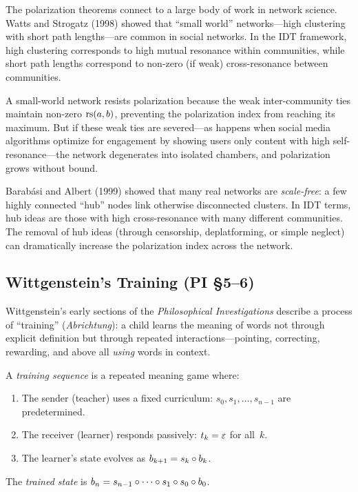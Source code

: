 \begin{interpretation}
\label{interp:polarization-network}
The polarization theorems connect to a large body of work in network science.
Watts and Strogatz (1998) showed that ``small world'' networks---high
clustering with short path lengths---are common in social networks.  In the
IDT framework, high clustering corresponds to high mutual resonance within
communities, while short path lengths correspond to non-zero (if weak)
cross-resonance between communities.

A small-world network resists polarization because the weak inter-community
ties maintain non-zero $\mathrm{rs}(a, b)$, preventing the polarization index from
reaching its maximum.  But if these weak ties are severed---as happens when
social media algorithms optimize for engagement by showing users only
content with high self-resonance---the network degenerates into isolated
chambers, and polarization grows without bound.

Barab\'{a}si and Albert (1999) showed that many real networks are
\emph{scale-free}: a few highly connected ``hub'' nodes link otherwise
disconnected clusters.  In IDT terms, hub ideas are those with high
cross-resonance with many different communities.  The removal of hub
ideas (through censorship, deplatforming, or simple neglect) can
dramatically increase the polarization index across the network.
\end{interpretation}


\subsection{Wittgenstein's Training (PI §5--6)}

Wittgenstein's early sections of the \emph{Philosophical Investigations}
describe a process of ``training'' (\emph{Abrichtung}): a child learns the
meaning of words not through explicit definition but through repeated
interactions---pointing, correcting, rewarding, and above all \emph{using}
words in context.

\begin{definition}
\label{def:training}
A \emph{training sequence} is a repeated meaning game where:
\begin{enumerate}
  \item The sender (teacher) uses a fixed curriculum:
        $s_0, s_1, \ldots, s_{n-1}$ are predetermined.
  \item The receiver (learner) responds passively: $t_k = \varepsilon$ for all~$k$.
  \item The learner's state evolves as $b_{k+1} = s_k \circ b_k$.
\end{enumerate}
The \emph{trained state} is $b_n = s_{n-1} \circ \cdots \circ s_1
\circ s_0 \circ b_0$.
\end{definition}

